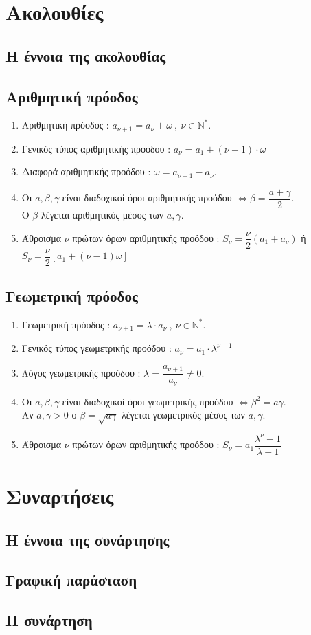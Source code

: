 \documentclass[a4paper,11pt]{article}
\begin{document}
\section{Ακολουθίες}
\subsection{Η έννοια της ακολουθίας}
\subsection{Αριθμητική πρόοδος}
\begin{enumerate}
\item Αριθμητική πρόοδος : $a_{\nu+1}=a_{\nu}+\omega\ ,\ \nu\in\mathbb{N}^*$.
\item Γενικός τύπος αριθμητικής προόδου : $a_{\nu}=a_1+(\nu-1)\cdot\omega$
\item Διαφορά αριθμητικής προόδου : $\omega=a_{\nu+1}-a_{\nu}$.
\item Οι $a,\beta,\gamma$ είναι διαδοχικοί όροι αριθμητικής προόδου $\Leftrightarrow \beta=\dfrac{a+\gamma}{2}$. \\Ο $\beta$ λέγεται αριθμητικός μέσος των $a,\gamma$.
\item Άθροισμα $\nu$ πρώτων όρων αριθμητικής προόδου : $S_{\nu}=\dfrac{\nu}{2}\left(a_1+a_{\nu}\right)$ ή $S_{\nu}=\dfrac{\nu}{2}\left[a_1+(\nu-1)\omega\right]$
\end{enumerate}
\subsection{Γεωμετρική πρόοδος}
\begin{enumerate}[resume]
\item Γεωμετρική πρόοδος : $a_{\nu+1}=\lambda\cdot a_{\nu}\ ,\ \nu\in\mathbb{N}^*$.
\item Γενικός τύπος γεωμετρικής προόδου : $a_{\nu}=a_1\cdot\lambda^{\nu+1}$
\item Λόγος γεωμετρικής προόδου : $\lambda=\dfrac{a_{\nu+1}}{a_{\nu}}\neq 0$.
\item Οι $a,\beta,\gamma$ είναι διαδοχικοί όροι γεωμετρικής προόδου $\Leftrightarrow \beta^2=a\gamma$. \\Αν $a,\gamma>0$ ο $\beta=\sqrt{a\gamma}$ λέγεται γεωμετρικός μέσος των $a,\gamma$.
\item Άθροισμα $\nu$ πρώτων όρων αριθμητικής προόδου : $S_{\nu}=a_1\dfrac{\lambda^{\nu}-1}{\lambda-1}$
\end{enumerate}
\section{Συναρτήσεις}
\subsection{Η έννοια της συνάρτησης}
\subsection{Γραφική παράσταση}
\subsection{Η συνάρτηση }
\end{document}
